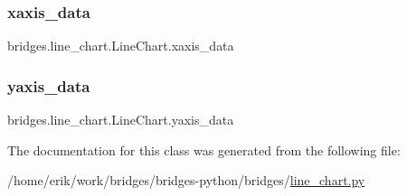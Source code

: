 \subsubsection{\texorpdfstring{xaxis\+\_\+data}{xaxis\_data}}
{\footnotesize\ttfamily bridges.\+line\+\_\+chart.\+Line\+Chart.\+xaxis\+\_\+data}

\mbox{\label{classbridges_1_1line__chart_1_1_line_chart_ae32afdcdfe6398ef247f9431de603495}} 
\subsubsection{\texorpdfstring{yaxis\+\_\+data}{yaxis\_data}}
{\footnotesize\ttfamily bridges.\+line\+\_\+chart.\+Line\+Chart.\+yaxis\+\_\+data}



The documentation for this class was generated from the following file\+:\begin{DoxyCompactItemize}
\item 
/home/erik/work/bridges/bridges-\/python/bridges/\hyperlink{line__chart_8py}{line\+\_\+chart.\+py}\end{DoxyCompactItemize}
